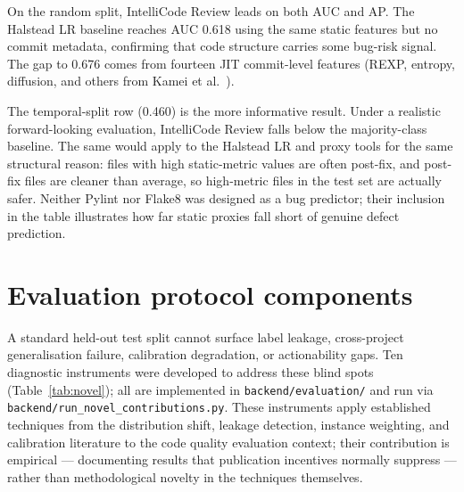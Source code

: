 \documentclass[12pt, oneside]{report}
\begin{document}
On the random split, IntelliCode Review leads on both AUC and AP. The Halstead LR
baseline reaches AUC 0.618 using the same static features but no commit metadata,
confirming that code structure carries some bug-risk signal. The gap to 0.676 comes
from fourteen JIT commit-level features (REXP, entropy, diffusion, and others from
Kamei et al.~\cite{kamei2013}).

The temporal-split row (0.460) is the more informative result. Under a realistic
forward-looking evaluation, IntelliCode Review falls below the majority-class baseline.
The same would apply to the Halstead LR and proxy tools for the same structural reason:
files with high static-metric values are often post-fix, and post-fix files are cleaner
than average, so high-metric files in the test set are actually safer. Neither Pylint
nor Flake8 was designed as a bug predictor; their inclusion in the table illustrates how
far static proxies fall short of genuine defect prediction.

\section{Evaluation protocol components}
\label{sec:novel-contributions}

A standard held-out test split cannot surface label leakage, cross-project generalisation failure, calibration degradation, or actionability gaps. Ten diagnostic instruments were developed to address these blind spots (Table~\ref{tab:novel}); all are implemented in \texttt{backend/evaluation/} and run via \texttt{backend/run\_novel\_contributions.py}. These instruments apply established techniques from the distribution shift, leakage detection, instance weighting, and calibration literature to the code quality evaluation context; their contribution is empirical — documenting results that publication incentives normally suppress — rather than methodological novelty in the techniques themselves.
\end{document}
